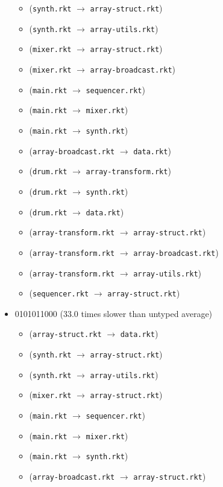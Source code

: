 \documentclass{article}
\newcommand{\mono}[1]{\texttt{#1}}
\begin{document}
\begin{itemize}
\begin{itemize}
  \item (\mono{synth.rkt} $\rightarrow$ \mono{array-struct.rkt})
  \item (\mono{synth.rkt} $\rightarrow$ \mono{array-utils.rkt})
  \item (\mono{mixer.rkt} $\rightarrow$ \mono{array-struct.rkt})
  \item (\mono{mixer.rkt} $\rightarrow$ \mono{array-broadcast.rkt})
  \item (\mono{main.rkt} $\rightarrow$ \mono{sequencer.rkt})
  \item (\mono{main.rkt} $\rightarrow$ \mono{mixer.rkt})
  \item (\mono{main.rkt} $\rightarrow$ \mono{synth.rkt})
  \item (\mono{array-broadcast.rkt} $\rightarrow$ \mono{data.rkt})
  \item (\mono{drum.rkt} $\rightarrow$ \mono{array-transform.rkt})
  \item (\mono{drum.rkt} $\rightarrow$ \mono{synth.rkt})
  \item (\mono{drum.rkt} $\rightarrow$ \mono{data.rkt})
  \item (\mono{array-transform.rkt} $\rightarrow$ \mono{array-struct.rkt})
  \item (\mono{array-transform.rkt} $\rightarrow$ \mono{array-broadcast.rkt})
  \item (\mono{array-transform.rkt} $\rightarrow$ \mono{array-utils.rkt})
  \item (\mono{sequencer.rkt} $\rightarrow$ \mono{array-struct.rkt})
  \end{itemize}
\item 0101011000 (33.0 times slower than untyped average)
  \begin{itemize}
  \item (\mono{array-struct.rkt} $\rightarrow$ \mono{data.rkt})
  \item (\mono{synth.rkt} $\rightarrow$ \mono{array-struct.rkt})
  \item (\mono{synth.rkt} $\rightarrow$ \mono{array-utils.rkt})
  \item (\mono{mixer.rkt} $\rightarrow$ \mono{array-struct.rkt})
  \item (\mono{main.rkt} $\rightarrow$ \mono{sequencer.rkt})
  \item (\mono{main.rkt} $\rightarrow$ \mono{mixer.rkt})
  \item (\mono{main.rkt} $\rightarrow$ \mono{synth.rkt})
  \item (\mono{array-broadcast.rkt} $\rightarrow$ \mono{array-struct.rkt})

\end{itemize}
\end{itemize}
\end{document}
